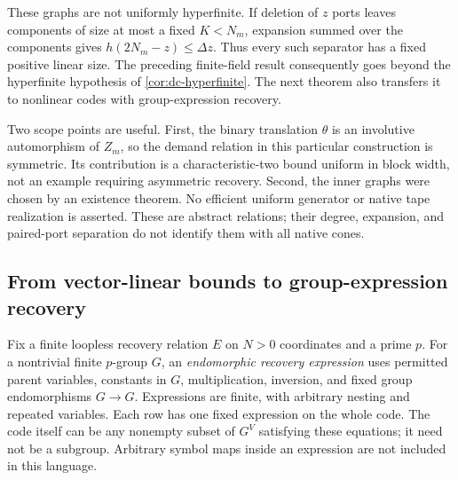 These graphs are not uniformly hyperfinite.  If deletion of $z$ ports
leaves components of size at most a fixed $K<N_m$, expansion summed
over the components gives
$h(2N_m-z)\le\Delta z$.  Thus every such separator has a fixed positive
linear size.  The preceding finite-field result consequently goes beyond
the hyperfinite hypothesis of \cref{cor:dc-hyperfinite}. The next theorem
also transfers it to nonlinear codes with group-expression recovery.

Two scope points are useful.  First, the binary translation $\theta$ is
an involutive automorphism of $Z_m$, so the demand relation in this
particular construction is symmetric.  Its contribution is a
characteristic-two bound uniform in block width, not an example requiring
asymmetric recovery.  Second, the inner graphs were chosen by an existence
theorem.  No efficient uniform generator or native tape realization is
asserted.  These are abstract relations; their degree, expansion, and
paired-port separation do not identify them with all native cones.

\subsection{From vector-linear bounds to group-expression recovery}

Fix a finite loopless recovery relation $E$ on $N>0$ coordinates and a
prime $p$. For a nontrivial finite $p$-group $G$, an \emph{endomorphic
recovery expression} uses permitted parent variables, constants in $G$,
multiplication, inversion, and fixed group endomorphisms $G\to G$.
Expressions are finite, with arbitrary nesting and repeated variables.
Each row has one fixed expression on the whole code. The code itself
can be any nonempty subset of $G^V$ satisfying these equations; it need
not be a subgroup. Arbitrary symbol maps inside an expression are not
included in this language.

